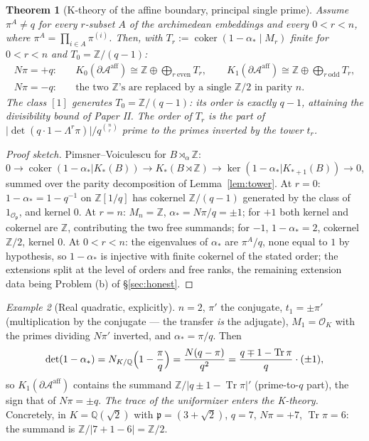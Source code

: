 \documentclass[11pt]{amsart}
\newtheorem{theorem}{Theorem}[section]
\theoremstyle{remark}
\newtheorem{example}[theorem]{Example}
\newcommand{\OK}{\mathcal{O}_K}
\newcommand{\Op}{\mathcal{O}_\pp}
\newcommand{\pp}{\mathfrak{p}}
\newcommand{\Z}{\mathbb{Z}}
\newcommand{\Q}{\mathbb{Q}}
\newcommand{\Ns}{N}
\newcommand{\Tr}{\operatorname{Tr}}
\newcommand{\coker}{\operatorname{coker}}
\newcommand{\Aaff}{\mathcal{A}^{\mathrm{aff}}}
\begin{document}
\begin{theorem}[K-theory of the affine boundary, principal single prime]\label{thm:main}
Assume $\pi^A\ne q$ for every $r$-subset $A$ of the archimedean embeddings and every
$0<r<n$, where $\pi^A=\prod_{i\in A}\pi^{(i)}$. Then, with $T_r:=\coker(1-\alpha_*\mid
M_r)$ finite for $0<r<n$ and $T_0=\Z/(q-1)$:
\begin{align*}
\Ns\pi=+q:&\quad K_0(\partial\Aaff)\cong\Z\oplus\bigoplus_{r\ \mathrm{even}}T_r,\qquad
K_1(\partial\Aaff)\cong\Z\oplus\bigoplus_{r\ \mathrm{odd}}T_r,\\
\Ns\pi=-q:&\quad\text{the two }\Z\text{'s are replaced by a single }\Z/2\text{ in parity }n .
\end{align*}
The class $[1]$ generates $T_0=\Z/(q-1)$: its order is \emph{exactly} $q-1$, attaining the
divisibility bound of Paper II. The order of $T_r$ is the part of
$\bigl|\det(q\cdot1-\Lambda^r\pi)\bigr|/q^{\binom nr}$ prime to the primes inverted by the
tower $t_r$.
\end{theorem}

\begin{proof}[Proof sketch]
Pimsner--Voiculescu \cite{PV} for $B\rtimes_\alpha\Z$:
$0\to\coker(1-\alpha_*|K_*(B))\to K_*(B\rtimes\Z)\to\ker(1-\alpha_*|K_{*+1}(B))\to0$,
summed over the parity decomposition of Lemma~\ref{lem:tower}. At $r=0$:
$1-\alpha_*=1-q^{-1}$ on $\Z[1/q]$ has cokernel $\Z/(q-1)$ generated by the class of
$1_{\Op}$, and kernel $0$. At $r=n$: $M_n=\Z$, $\alpha_*=\Ns\pi/q=\pm1$; for $+1$ both
kernel and cokernel are $\Z$, contributing the two free summands; for $-1$,
$1-\alpha_*=2$, cokernel $\Z/2$, kernel $0$. At $0<r<n$: the eigenvalues of $\alpha_*$
are $\pi^A/q$, none equal to $1$ by hypothesis, so $1-\alpha_*$ is injective with finite
cokernel of the stated order; the extensions split at the level of orders and free ranks,
the remaining extension data being Problem (b) of \S\ref{sec:honest}.
\end{proof}

\begin{example}[Real quadratic, explicitly]\label{ex:quadratic}
$n=2$, $\pi'$ the conjugate, $t_1=\pm\pi'$ (multiplication by the conjugate --- the
transfer \emph{is} the adjugate), $M_1=\OK$ with the primes dividing $\Ns\pi'$ inverted,
and $\alpha_*=\pi/q$. Then
\[
\det(1-\alpha_*)=\Ns_{K/\Q}\Bigl(1-\frac{\pi}{q}\Bigr)=\frac{\Ns(q-\pi)}{q^2}
=\frac{q\mp1-\Tr\pi}{q}\cdot(\pm1),
\]
so $K_1(\partial\Aaff)$ contains the summand $\Z/\bigl|q\pm1-\Tr\pi\bigr|'$ (prime-to-$q$
part), the sign that of $\Ns\pi=\pm q$. \emph{The trace of the uniformizer enters the
K-theory.} Concretely, in $K=\Q(\sqrt2)$ with $\pp=(3+\sqrt2)$, $q=7$, $\Ns\pi=+7$,
$\Tr\pi=6$: the summand is $\Z/|7+1-6|=\Z/2$.
\end{example}
\end{document}
